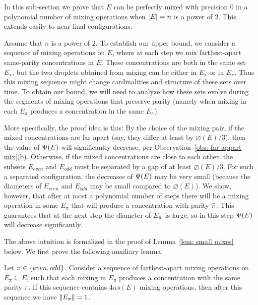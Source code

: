 
%

In this sub-section we prove that $E$ can be perfectly mixed with precision $0$
in a polynomial number of mixing operations when ${|E|}=n$ is a power of $2$.
This extends easily to near-final configurations.

Assume that $n$ is a power of $2$. To establish our upper bound, we
consider a sequence of mixing operations on $E$, where at each step we mix
farthest-apart same-parity concentrations in $E$. These concentrations
are both in the same set $E_\pi$, but the two droplets obtained from mixing can be
either in $E_\pi$ or in $E_{\bar{\pi}}$. Thus this mixing sequence might change
cardinalities and structure of these sets over time. To obtain our bound, we 
will need to analyze how these sets evolve during the segments of mixing operations
that preserve parity (namely when mixing in each $E_\pi$
produces a concentration in the same $E_\pi$).

More specifically, the proof idea is this: By the choice of the mixing pair,
if the mixed concentrations are far apart (say, they differ at least by $\diameter(E)/3$), 
then the value of ${\Psi}(E)$ will significantly decrease, per Observation~\ref{obs: far-appart mix}(b).
Otherwise, if the mixed concentrations are close to each other, the subsets $E_{even}$ and
$E_{odd}$ must be separated by a gap of at least $\diameter(E)/3$. For such a 
separated configuration, the decreases of ${\Psi}(E)$ may be very small (because
the diameters of $E_{even}$ and $E_{odd}$ may be small compared to $\diameter(E)$).
We show, however, that after at most a polynomial number of steps there will be a
mixing operation in some $E_\pi$ that will produce a concentration with
parity ${\bar{\pi}}$. This guarantees that at the next step the diameter of $E_{{\bar{\pi}}}$ is
large, so in this step ${\Psi}(E)$ will decrease significantly.     

The above intuition is formalized in  the proof of Lemma~\ref{lem: small mixes} below.
We first prove the following auxiliary lemma.  


\begin{lemma}\label{lem: same-parity mixability}     
	Let $\pi\in{ \left\{ even,odd \right\} }$. 
	Consider a sequence of farthest-apart mixing operations on $E_\pi\subseteq E$, such
	that each mixing in $E_\pi$ produces a concentration with the same parity $\pi$.
	If this sequence contains $4ns(E)$ mixing operations, then after
	this sequence we have ${\|E_\pi\|} = 1$.
\end{lemma} 

